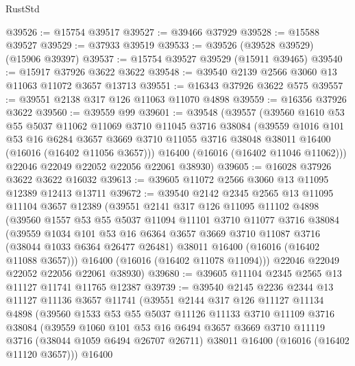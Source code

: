\begin{lexlean}{RustStd}
\begin{coremodule}
@39526 := @15754 @39517
@39527 := @39466 @37929
@39528 := @15588 @39527
@39529 := @37933 @39519
@39533 := @39526 (@39528 @39529) (@15906 @39397)
@39537 := @15754 @39527 @39529 (@15911 @39465)
@39540 := @15917 @37926 @3622 @3622
@39548 := @39540 @2139 @2566 @3060 @13 @11063 @11072 @3657 @13713
@39551 := @16343 @37926 @3622 @575
@39557 := @39551 @2138 @317 @126 @11063 @11070 @4898
@39559 := @16356 @37926 @3622
@39560 := @39559 @99
@39601 := @39548
    (@39557
      (@39560
        @1610
        @53
        @55
        @5037
        @11062
        @11069
        @3710
        @11045
        @3716
        @38084
        (@39559
          @1016
          @101
          @53
          @16
          @6284
          @3657
          @3669
          @3710
          @11055
          @3716
          @38048
          @38011
          @16400
          (@16016 (@16402 @11056 @3657)))
        @16400
        (@16016 (@16402 @11046 @11062)))
      @22046
      @22049
      @22052
      @22056
      @22061
      @38930)
@39605 := @16028 @37926 @3622 @3622 @16032
@39613 := @39605 @11072 @2566 @3060 @13 @11095 @12389 @12413 @13711
@39672 := @39540
    @2142
    @2345
    @2565
    @13
    @11095
    @11104
    @3657
    @12389
    (@39551
      @2141
      @317
      @126
      @11095
      @11102
      @4898
      (@39560
        @1557
        @53
        @55
        @5037
        @11094
        @11101
        @3710
        @11077
        @3716
        @38084
        (@39559
          @1034
          @101
          @53
          @16
          @6364
          @3657
          @3669
          @3710
          @11087
          @3716
          (@38044 @1033 @6364 @26477 @26481)
          @38011
          @16400
          (@16016 (@16402 @11088 @3657)))
        @16400
        (@16016 (@16402 @11078 @11094)))
      @22046
      @22049
      @22052
      @22056
      @22061
      @38930)
@39680 := @39605 @11104 @2345 @2565 @13 @11127 @11741 @11765 @12387
@39739 := @39540
    @2145
    @2236
    @2344
    @13
    @11127
    @11136
    @3657
    @11741
    (@39551
      @2144
      @317
      @126
      @11127
      @11134
      @4898
      (@39560
        @1533
        @53
        @55
        @5037
        @11126
        @11133
        @3710
        @11109
        @3716
        @38084
        (@39559
          @1060
          @101
          @53
          @16
          @6494
          @3657
          @3669
          @3710
          @11119
          @3716
          (@38044 @1059 @6494 @26707 @26711)
          @38011
          @16400
          (@16016 (@16402 @11120 @3657)))
        @16400

\end{coremodule}
\end{lexlean}
